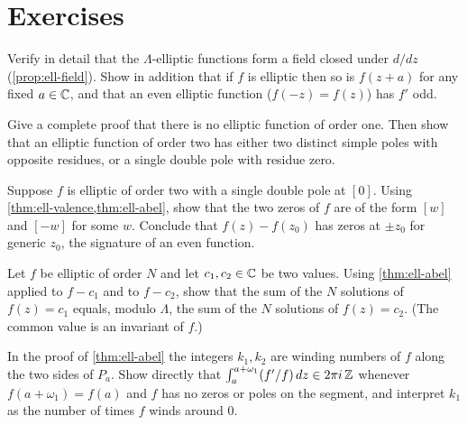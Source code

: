 \section*{Exercises}

\begin{exercise}
\label{ex:ell-field}
Verify in detail that the \(\Lambda\)-elliptic functions form a field closed
under \(d/dz\) (\cref{prop:ell-field}). Show in addition that if \(f\) is
elliptic then so is \(f(z+a)\) for any fixed \(a \in \mathbb{C}\), and that an even
elliptic function (\(f(-z) = f(z)\)) has \(f'\) odd.
\end{exercise}

\begin{exercise}
\label{ex:ell-no-order-one}
Give a complete proof that there is no elliptic function of order one. Then show
that an elliptic function of order two has either two distinct simple poles with
opposite residues, or a single double pole with residue zero.
\end{exercise}

\begin{exercise}
\label{ex:ell-double-pole-zeros}
Suppose \(f\) is elliptic of order two with a single double pole at \([0]\).
Using \cref{thm:ell-valence,thm:ell-abel}, show that the two zeros of \(f\) are
of the form \([w]\) and \([-w]\) for some \(w\). Conclude that \(f(z) - f(z_0)\)
has zeros at \(\pm z_0\) for generic \(z_0\), the signature of an even function.
\end{exercise}

\begin{exercise}
\label{ex:ell-sum-values}
Let \(f\) be elliptic of order \(N\) and let \(c_1, c_2 \in \mathbb{C}\) be two values.
Using \cref{thm:ell-abel} applied to \(f - c_1\) and to \(f - c_2\), show that
the sum of the \(N\) solutions of \(f(z) = c_1\) equals, modulo \(\Lambda\), the
sum of the \(N\) solutions of \(f(z) = c_2\). (The common value is an invariant
of \(f\).)
\end{exercise}

\begin{exercise}
\label{ex:ell-winding}
In the proof of \cref{thm:ell-abel} the integers \(k_1, k_2\) are winding
numbers of \(f\) along the two sides of \(P_a\). Show directly that
\(\int_a^{a+\omega_1} (f'/f)\,dz \in 2\pi i\,\mathbb{Z}\) whenever \(f(a+\omega_1) =
f(a)\) and \(f\) has no zeros or poles on the segment, and interpret \(k_1\) as
the number of times \(f\) winds around \(0\).
\end{exercise}
